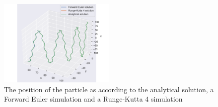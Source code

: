 \begin{figure}[h]
    \centering
    \includegraphics[width=0.5\textwidth]{data/position_estimates.pdf}
    \caption{The position of the particle as according to the analytical solution, a Forward Euler simulation and a Runge-Kutta 4 simulation}
    \label{fig:estimated_positions}
\end{figure}

